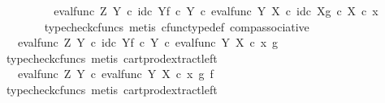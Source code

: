 \begin{isabellebody}
\ \ \ \ \isamarkupfalse%
\ \isamarkupfalse%
\ {\isachardoublequoteopen}{\isachardot}{\kern0pt}{\isachardot}{\kern0pt}{\isachardot}{\kern0pt}\ {\isacharequal}{\kern0pt}\ eval{\isacharunderscore}{\kern0pt}func\ Z\ Y\ {\isasymcirc}\isactrlsub c\ {\isasymlangle}id\isactrlsub c\ Y{\isacharcomma}{\kern0pt}f\ {\isasymcirc}\isactrlsub c\ {\isasymbeta}\isactrlbsub Y\isactrlesub {\isasymrangle}\ {\isasymcirc}\isactrlsub c\ eval{\isacharunderscore}{\kern0pt}func\ Y\ X\ {\isasymcirc}\isactrlsub c\ {\isasymlangle}id\isactrlsub c\ X{\isacharcomma}{\kern0pt}g\ {\isasymcirc}\isactrlsub c\ {\isasymbeta}\isactrlbsub X\isactrlesub {\isasymrangle}\ {\isasymcirc}\isactrlsub c\ x{\isachardoublequoteclose}\isanewline
\ \ \ \ \ \ \isamarkupfalse%
\ {\isacharparenleft}{\kern0pt}typecheck{\isacharunderscore}{\kern0pt}cfuncs{\isacharcomma}{\kern0pt}\ metis\ cfunc{\isacharunderscore}{\kern0pt}type{\isacharunderscore}{\kern0pt}def\ comp{\isacharunderscore}{\kern0pt}associative{\isacharparenright}{\kern0pt}\isanewline
\ \ \ \ \isamarkupfalse%
\ \isamarkupfalse%
\ {\isachardoublequoteopen}{\isachardot}{\kern0pt}{\isachardot}{\kern0pt}{\isachardot}{\kern0pt}\ {\isacharequal}{\kern0pt}\ eval{\isacharunderscore}{\kern0pt}func\ Z\ Y\ {\isasymcirc}\isactrlsub c\ {\isasymlangle}id\isactrlsub c\ Y{\isacharcomma}{\kern0pt}f\ {\isasymcirc}\isactrlsub c\ {\isasymbeta}\isactrlbsub Y\isactrlesub {\isasymrangle}\ {\isasymcirc}\isactrlsub c\ eval{\isacharunderscore}{\kern0pt}func\ Y\ X\ {\isasymcirc}\isactrlsub c\ {\isasymlangle}x\ {\isacharcomma}{\kern0pt}g{\isasymrangle}{\isachardoublequoteclose}\isanewline
\ \ \ \ \ \ \isamarkupfalse%
\ {\isacharparenleft}{\kern0pt}typecheck{\isacharunderscore}{\kern0pt}cfuncs{\isacharcomma}{\kern0pt}\ metis\ cart{\isacharunderscore}{\kern0pt}prod{\isacharunderscore}{\kern0pt}extract{\isacharunderscore}{\kern0pt}left{\isacharparenright}{\kern0pt}\isanewline
\ \ \ \ \isamarkupfalse%
\ \isamarkupfalse%
\ {\isachardoublequoteopen}{\isachardot}{\kern0pt}{\isachardot}{\kern0pt}{\isachardot}{\kern0pt}\ {\isacharequal}{\kern0pt}\ eval{\isacharunderscore}{\kern0pt}func\ Z\ Y\ {\isasymcirc}\isactrlsub c\ {\isasymlangle}eval{\isacharunderscore}{\kern0pt}func\ Y\ X\ {\isasymcirc}\isactrlsub c\ {\isasymlangle}x\ {\isacharcomma}{\kern0pt}g{\isasymrangle}\ {\isacharcomma}{\kern0pt}f{\isasymrangle}{\isachardoublequoteclose}\isanewline
\ \ \ \ \ \ \isamarkupfalse%
\ {\isacharparenleft}{\kern0pt}typecheck{\isacharunderscore}{\kern0pt}cfuncs{\isacharcomma}{\kern0pt}\ metis\ cart{\isacharunderscore}{\kern0pt}prod{\isacharunderscore}{\kern0pt}extract{\isacharunderscore}{\kern0pt}left{\isacharparenright}{\kern0pt}\isanewline

\end{isabellebody}

